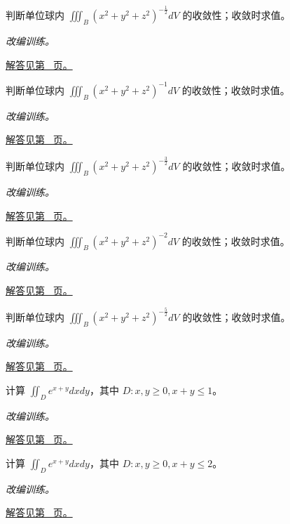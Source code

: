 \documentclass[UTF8,12pt,a4paper,fontset=fandol]{ctexart}
\begin{document}
\begin{example}[球心奇点的维数阈值]\label{ex:c40q14}
判断单位球内 $\displaystyle\iiint_B(x^2+y^2+z^2)^{-\frac{1}{2}}dV$ 的收敛性；收敛时求值。
\par\textit{改编训练。}\par\hyperref[ans:c40q14]{解答见第~\pageref{ans:c40q14} 页。}
\end{example}
\begin{example}[球心奇点的维数阈值]\label{ex:c40q15}
判断单位球内 $\displaystyle\iiint_B(x^2+y^2+z^2)^{-1}dV$ 的收敛性；收敛时求值。
\par\textit{改编训练。}\par\hyperref[ans:c40q15]{解答见第~\pageref{ans:c40q15} 页。}
\end{example}
\begin{example}[球心奇点的维数阈值]\label{ex:c40q16}
判断单位球内 $\displaystyle\iiint_B(x^2+y^2+z^2)^{-\frac{3}{2}}dV$ 的收敛性；收敛时求值。
\par\textit{改编训练。}\par\hyperref[ans:c40q16]{解答见第~\pageref{ans:c40q16} 页。}
\end{example}
\begin{example}[球心奇点的维数阈值]\label{ex:c40q17}
判断单位球内 $\displaystyle\iiint_B(x^2+y^2+z^2)^{-2}dV$ 的收敛性；收敛时求值。
\par\textit{改编训练。}\par\hyperref[ans:c40q17]{解答见第~\pageref{ans:c40q17} 页。}
\end{example}
\begin{example}[球心奇点的维数阈值]\label{ex:c40q18}
判断单位球内 $\displaystyle\iiint_B(x^2+y^2+z^2)^{-\frac{5}{2}}dV$ 的收敛性；收敛时求值。
\par\textit{改编训练。}\par\hyperref[ans:c40q18]{解答见第~\pageref{ans:c40q18} 页。}
\end{example}
\begin{example}[三角形上的指数密度]\label{ex:c40q19}
计算 $\displaystyle\iint_D e^{x+y}dxdy$，其中 $D:x,y\ge0,x+y\le 1$。
\par\textit{改编训练。}\par\hyperref[ans:c40q19]{解答见第~\pageref{ans:c40q19} 页。}
\end{example}
\begin{example}[三角形上的指数密度]\label{ex:c40q20}
计算 $\displaystyle\iint_D e^{x+y}dxdy$，其中 $D:x,y\ge0,x+y\le 2$。
\par\textit{改编训练。}\par\hyperref[ans:c40q20]{解答见第~\pageref{ans:c40q20} 页。}
\end{example}
\end{document}
